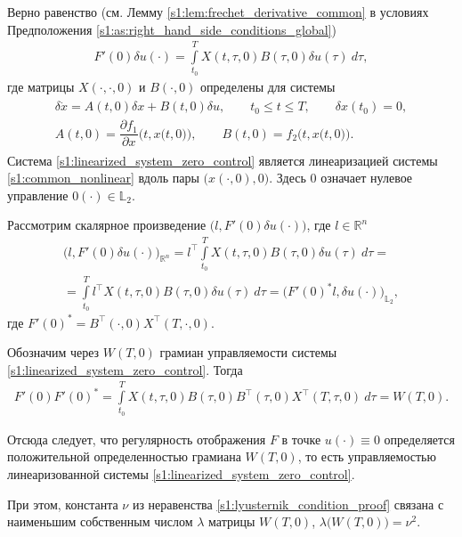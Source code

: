 \documentclass[../main.tex]{subfiles}
\begin{document}
Верно равенство (см.  Лемму \ref{s1:lem:frechet_derivative_common} в условиях Предположения  \ref{s1:as:right_hand_side_conditions_global})
\begin{gather*}
    F'(0) \delta u(\cdot) =  \int\limits_{t_0}^{T} X(t, \tau, 0) B(\tau, 0) \delta u(\tau) \ d\tau,
\end{gather*}
где матрицы $X(\cdot, \cdot, 0)$  и $B(\cdot, 0)$ определены для системы
 \begin{gather}\label{s1:linearized_system_zero_control}
 \begin{gathered}
 		\delta \dot{x} =  A(t, 0) \delta x + B(t, 0) \delta u, \qquad t_0 \leqslant t \leqslant T, \qquad \delta x(t_0) = 0,  \\
 		A(t, 0) = \dfrac{\partial f_1}{\partial x} \Big(t,x\big(t,0\big)\Big), \qquad
 		B(t, 0) = f_2 \Big(t,x\big(t,0\big)\Big).
 \end{gathered}
\end{gather}
 Система \eqref{s1:linearized_system_zero_control} является линеаризацией системы \eqref{s1:common_nonlinear} вдоль пары $\Big(x(\cdot, 0), 0\Big) $.
Здесь $0$ означает нулевое управление $0(\cdot) \in \mathbb{L}_2$.

Рассмотрим скалярное произведение $ \Big(l,  F'(0) \delta u(\cdot)\Big) $, где $ l \in \mathbb{R}^n$
\begin{gather*}
	\Big(l,  F'(0) \delta u(\cdot)\Big)_{\mathbb{R}^n} =
	 l^{\top}  \int\limits_{t_0}^{T} X(t, \tau, 0) B(\tau, 0) \delta u(\tau) \ d\tau = \\ = 
	  \int\limits_{t_0}^{T} l^{\top} X(t, \tau, 0) B(\tau, 0)  \delta u(\tau) \ d\tau =
	   \Big(F'(0)^* l,  \delta u(\cdot)\Big)_{\mathbb{L}_2},
\end{gather*}
где $ F'(0)^* =  B^{\top} (\cdot, 0) X^{\top}(T, \cdot, 0)$.

Обозначим через  $W(T,0) $ грамиан управляемости системы \eqref{s1:linearized_system_zero_control}.
Тогда 
\begin{gather}\label{s1:self_adjoint_with_derivative}
    F'(0) F'(0)^* = \int\limits_{t_0}^{T} X(t, \tau, 0) B(\tau, 0) B^{\top} (\tau, 0) X^{\top}(T, \tau, 0) \ d\tau= W(T,0).
\end{gather}

Отсюда следует, что  регулярность отображения  $F$ в точке $u(\cdot) \equiv 0$ определяется положительной определенностью грамиана  $W(T,0) $, то есть управляемостью линеаризованной системы \eqref{s1:linearized_system_zero_control}. 

При этом, константа $\nu$ из неравенства \eqref{s1:lyusternik_condition_proof} связана с наименьшим собственным числом $\lambda$ матрицы $W(T,0) $,  $\lambda\big(W(T,0)\big) = \nu^2$.
    
\end{document}
